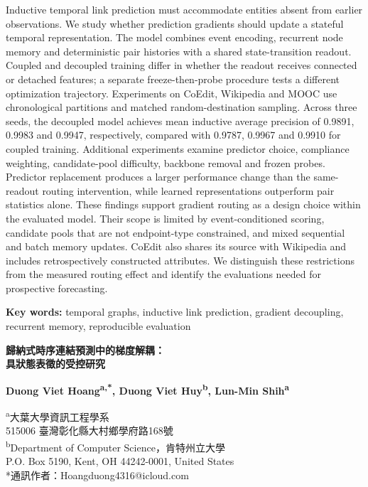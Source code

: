 \documentclass[a4paper,10pt,fleqn]{article}
\begin{document}
\begin{list}{}{\setlength{\leftmargin}{2cm}\setlength{\rightmargin}{2cm}}\item[]
Inductive temporal link prediction must accommodate entities absent from earlier observations. We study whether prediction gradients should update a stateful temporal representation. The model combines event encoding, recurrent node memory and deterministic pair histories with a shared state-transition readout. Coupled and decoupled training differ in whether the readout receives connected or detached features; a separate freeze-then-probe procedure tests a different optimization trajectory. Experiments on CoEdit, Wikipedia and MOOC use chronological partitions and matched random-destination sampling. Across three seeds, the decoupled model achieves mean inductive average precision of 0.9891, 0.9983 and 0.9947, respectively, compared with 0.9787, 0.9967 and 0.9910 for coupled training. Additional experiments examine predictor choice, compliance weighting, candidate-pool difficulty, backbone removal and frozen probes. Predictor replacement produces a larger performance change than the same-readout routing intervention, while learned representations outperform pair statistics alone. These findings support gradient routing as a design choice within the evaluated model. Their scope is limited by event-conditioned scoring, candidate pools that are not endpoint-type constrained, and mixed sequential and batch memory updates. CoEdit also shares its source with Wikipedia and includes retrospectively constructed attributes. We distinguish these restrictions from the measured routing effect and identify the evaluations needed for prospective forecasting.

\vspace{10pt}\noindent\textbf{Key words:} temporal graphs, inductive link prediction, gradient decoupling, recurrent memory, reproducible evaluation
\end{list}
\clearpage
\begin{center}
{\fontsize{18}{25}\selectfont\bfseries 歸納式時序連結預測中的梯度解耦：\\具狀態表徵的受控研究\par}
\vspace{12pt}
{\fontsize{10}{15}\selectfont\bfseries Duong Viet Hoang\textsuperscript{a,*}, Duong Viet Huy\textsuperscript{b}, Lun-Min Shih\textsuperscript{a}\par}
\vspace{6pt}
\textsuperscript{a}大葉大學資訊工程學系\\
515006 臺灣彰化縣大村鄉學府路168號\\
\textsuperscript{b}Department of Computer Science，肯特州立大學\\
P.O. Box 5190, Kent, OH 44242-0001, United States\\
*通訊作者：Hoangduong4316@icloud.com
\end{center}
\end{document}
